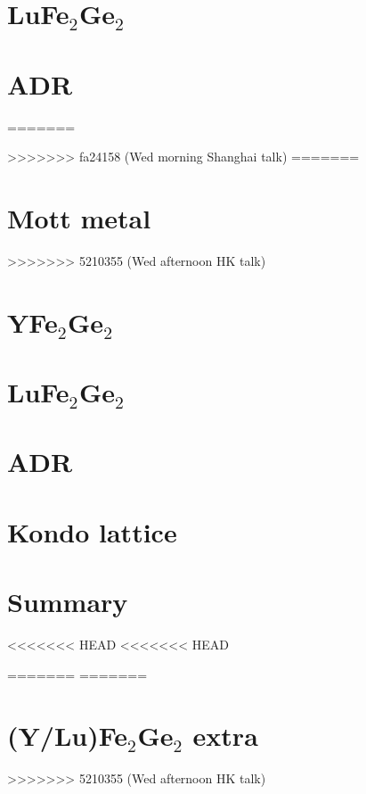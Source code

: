 \section{LuFe$_2$Ge$_2$}

% 

\section{ADR}

=======

>>>>>>> fa24158 (Wed morning Shanghai talk)
=======
\section{Mott metal}

>>>>>>> 5210355 (Wed afternoon HK talk)


\section{YFe$_2$Ge$_2$}
%


\section{LuFe$_2$Ge$_2$}

% 
\section{ADR}




\section{Kondo lattice}


%


\section{Summary}



\appendix




<<<<<<< HEAD
<<<<<<< HEAD

=======
=======
\section{(Y/Lu)Fe$_2$Ge$_2$ extra}


>>>>>>> 5210355 (Wed afternoon HK talk)

